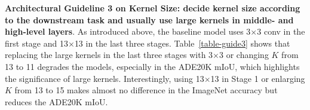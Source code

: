 \documentclass[10pt,twocolumn,letterpaper]{article}
\begin{document}
	\begin{table}
		\caption{Models with different forms of Structural Re-parameterization on the 13$\times$13 conv layers.}
		\label{table-reparam}
		\vspace{-0.2in}
		\begin{center}
		\end{center}
		\vspace{-0.2in}
	\end{table}

\noindent\textbf{Architectural Guideline 3 on Kernel Size: decide kernel size according to the downstream task and usually use large kernels in middle- and high-level layers}. As introduced above, the baseline model uses 3$\times$3 conv in the first stage and 13$\times$13 in the last three stages. Table~\ref{table-guide3} shows that replacing the large kernels in the last three stages with 3$\times$3 or changing $K$ from 13 to 11 degrades the models, especially in the ADE20K mIoU, which highlights the significance of large kernels. Interestingly, using 13$\times$13 in Stage 1 or enlarging $K$ from 13 to 15 makes almost no difference in the ImageNet accuracy but reduces the ADE20K mIoU.
\end{document}
